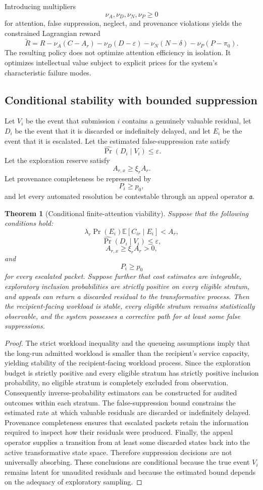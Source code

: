 \documentclass[11pt]{article}
\newtheorem{theorem}[definition]{Theorem}
\theoremstyle{definition}
\newcommand{\E}{\mathbb{E}}
\newcommand{\eps}{\varepsilon}
\begin{document}
Introducing multipliers
\[
\nu_A,\nu_D,\nu_N,\nu_P\geq0
\]
for attention, false suppression, neglect, and provenance violations yields the constrained Lagrangian reward
\[
\widetilde{R}
=
R
-
\nu_A(C-A_r)
-
\nu_D(D-\eps)
-
\nu_N(N-\delta)
-
\nu_P(P-\pi_0).
\]
The resulting policy does not optimize attention efficiency in isolation. It optimizes intellectual value subject to explicit prices for the system's characteristic failure modes.

\subsection{Conditional stability with bounded suppression}

Let \(V_i\) be the event that submission \(i\) contains a genuinely valuable residual, let \(D_i\) be the event that it is discarded or indefinitely delayed, and let \(E_i\) be the event that it is escalated. Let the estimated false-suppression rate satisfy
\[
\widehat{\Pr}(D_i\mid V_i)\leq\eps.
\]
Let the exploration reserve satisfy
\[
A_{r,x}\geq\xi_r A_r.
\]
Let provenance completeness be represented by
\[
P_i\geq p_0,
\]
and let every automated resolution be contestable through an appeal operator \(\mathfrak{a}\).

\begin{theorem}[Conditional finite-attention viability]
Suppose that the following conditions hold:
\[
\lambda_r\Pr(E_i)\E[C_{ir}\mid E_i]<A_r,
\]
\[
\widehat{\Pr}(D_i\mid V_i)\leq\eps,
\]
\[
A_{r,x}\geq\xi_rA_r>0,
\]
and
\[
P_i\geq p_0
\]
for every escalated packet. Suppose further that cost estimates are integrable, exploratory inclusion probabilities are strictly positive on every eligible stratum, and appeals can return a discarded residual to the transformative process. Then the recipient-facing workload is stable, every eligible stratum remains statistically observable, and the system possesses a corrective path for at least some false suppressions.
\end{theorem}

\begin{proof}
The strict workload inequality and the queueing assumptions imply that the long-run admitted workload is smaller than the recipient's service capacity, yielding stability of the recipient-facing workload process. Since the exploration budget is strictly positive and every eligible stratum has strictly positive inclusion probability, no eligible stratum is completely excluded from observation. Consequently inverse-probability estimators can be constructed for audited outcomes within each stratum. The false-suppression bound constrains the estimated rate at which valuable residuals are discarded or indefinitely delayed. Provenance completeness ensures that escalated packets retain the information required to inspect how their residuals were produced. Finally, the appeal operator supplies a transition from at least some discarded states back into the active transformative state space. Therefore suppression decisions are not universally absorbing. These conclusions are conditional because the true event \(V_i\) remains latent for unaudited residuals and because the estimated bound depends on the adequacy of exploratory sampling.
\end{proof}
\end{document}
